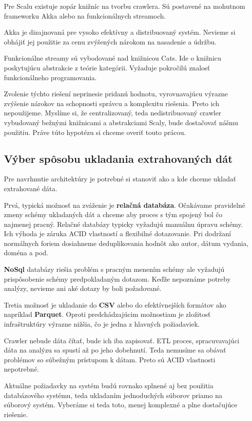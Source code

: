 Pre Scalu existuje zopár knižníc na tvorbu crawlera. Sú postavené na mohutnom frameworku Akka alebo na funkcionálnych streamoch. 

Akka je dizajnovaná pre vysoko efektívny a distribuovaný systém. Nevieme si obhájiť jej použitie za cenu zvýšených nárokom na nasadenie a údržbu. 

Funkcionálne streamy sú vybodované nad knižnicou Cats. Ide o knižnicu poskytujúcu abstrakcie z teórie kategórii. Vyžaduje pokročilú znalosť funkcionálneho programovania. 

Zvolenie týchto riešení neprinesie pridanú hodnotu, vyrovnavajúcu výrazne zvýšenie nárokov na schopnosti správcu a komplexitu riešenia. Preto ich nepoužijeme. Myslíme si, že centralizovaný, teda nedistribuovaný crawler vybudovaný bežnými knižnicami a abstrakciami Scaly, bude dostačovať nášmu použitiu. Práve túto hypotézu si chceme overiť touto prácou.  

\subsection{Výber spôsobu ukladania extrahovaných dát} \label{subsec:pickSaving}
Pre navrhnutie architektúry je potrebné si stanoviť ako a kde chceme ukladať extrahované dáta. 

Prvá, typická možnosť na zváženie je \textbf{relačná databáza}. Očakávame pravidelné zmeny schémy ukladaných dát a chceme aby proces s tým spojený bol čo najmenej pracný. Relačné databázy typicky vyžadujú manuálnu úpravu schémy. Ich výhoda je záruka ACID vlastností a flexibilné dotazovanie. Pri dodržaní normálnych foriem dosiahneme deduplikovania hodnôt ako autor, dátum vydania, doména a pod. 

\textbf{NoSql} databázy riešia problém s pracným menením schémy ale vyžadujú prispôsobenie schémy predpokladaným dotazom. Keďže nepoznáme potreby analýzy, nevieme ani aké dotazy by boli požadované. 

Tretia možnosť je ukladanie do \textbf{CSV} alebo do efektívnejších formátov ako napríklad \textbf{Parquet}. Oproti predchádzajúcim možnostiam je zložitosť infraštruktúry výrazne nižšia, čo je jedna z hlavných požiadaviek. 

Crawler nebude dáta čítať, bude ich iba zapisovať. ETL proces, spracuvavajúci dáta na analýzu sa spustí až po jeho dobehnutí. Teda nemusíme sa obávať problémov so súbežným prístupom k dátam. Preto sú ACID vlastnosti nepotrebné.

Aktuálne požiadavky na systém budú rovnako splnené aj bez použitia databázového systému, teda ukladaním jednoduchých súborov priamo na súborový systém. Vyberáme si teda toto, menej komplexné a plne dostačujúce riešenie. 




